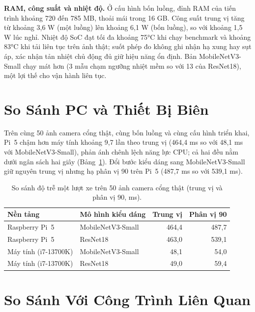 \textbf{RAM, công suất và nhiệt độ.} Ở cấu hình bốn luồng, đỉnh RAM của tiến trình khoảng 720
đến 785 MB, thoải mái trong 16 GB. Công suất trung vị tăng từ khoảng 3,6 W (một luồng) lên
khoảng 6,1 W (bốn luồng), so với khoảng 1,5 W lúc nghỉ. Nhiệt độ SoC đạt tối đa khoảng 75°C
khi chạy benchmark và khoảng 83°C khi tải liên tục trên ảnh thật; suốt phép đo không ghi nhận
hạ xung hay sụt áp, xác nhận tản nhiệt chủ động đủ giữ hiệu năng ổn định. Bản
MobileNetV3-Small chạy mát hơn (3 mẫu chạm ngưỡng nhiệt mềm so với 13 của ResNet18), một lợi
thế cho vận hành liên tục.

\section{So Sánh PC và Thiết Bị Biên}
\label{sec:trienkhai-sosanh-pc-bien}

Trên cùng 50 ảnh camera cổng thật, cùng bốn luồng và cùng cấu hình triển khai, Pi~5 chậm hơn
máy tính khoảng 9,7 lần theo trung vị (464,4 ms so với 48,1 ms với MobileNetV3-Small), phản
ánh chênh lệch năng lực CPU; cả hai đều nằm dưới ngân sách hai giây (Bảng~\ref{tab:pc-vs-pi}).
Đổi bước kiểu dáng sang MobileNetV3-Small giữ nguyên trung vị nhưng hạ phân vị 90 trên Pi~5
(487,7 ms so với 539,1 ms).

\begin{table}[htbp]
\centering
\caption{So sánh độ trễ một lượt xe trên 50 ảnh camera cổng thật (trung vị và phân vị 90, ms).}

\label{tab:pc-vs-pi}
\begin{tabular}{llrr}
\toprule
\textbf{Nền tảng} & \textbf{Mô hình kiểu dáng} & \textbf{Trung vị} & \textbf{Phân vị 90} \\
\midrule
Raspberry Pi~5        & MobileNetV3-Small & 464,4 & 487,7 \\
Raspberry Pi~5        & ResNet18          & 463,0 & 539,1 \\
Máy tính (i7-13700K)  & MobileNetV3-Small &  48,1 &  54,0 \\
Máy tính (i7-13700K)  & ResNet18          &  49,0 &  59,4 \\
\bottomrule
\end{tabular}
\end{table}

\section{So Sánh Với Công Trình Liên Quan}
\label{sec:trienkhai-sosanh-lienquan}


